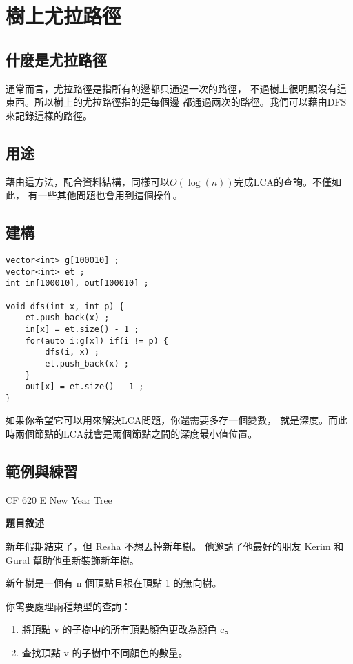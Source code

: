 \section{樹上尤拉路徑}
    \subsection{什麼是尤拉路徑}
    通常而言，尤拉路徑是指所有的邊都只通過一次的路徑，
    不過樹上很明顯沒有這東西。所以樹上的尤拉路徑指的是每個邊
    都通過兩次的路徑。我們可以藉由DFS來記錄這樣的路徑。

    \subsection{用途}
    藉由這方法，配合資料結構，同樣可以$O(\log(n))$完成LCA的查詢。不僅如此，
    有一些其他問題也會用到這個操作。

    \subsection{建構}
\begin{lstlisting}[caption=樹上尤拉路徑]
vector<int> g[100010] ;
vector<int> et ;
int in[100010], out[100010] ;
 
void dfs(int x, int p) {
    et.push_back(x) ;
    in[x] = et.size() - 1 ;
    for(auto i:g[x]) if(i != p) {
        dfs(i, x) ;
        et.push_back(x) ;
    }
    out[x] = et.size() - 1 ;
}
\end{lstlisting}

    如果你希望它可以用來解決LCA問題，你還需要多存一個變數，
    就是深度。而此時兩個節點的LCA就會是兩個節點之間的深度最小值位置。

    \subsection{範例與練習}
    \problem CF 620 E New Year Tree

    \textbf{題目敘述}

    新年假期結束了，但 Resha 不想丟掉新年樹。
    他邀請了他最好的朋友 Kerim 和 Gural 幫助他重新裝飾新年樹。

    新年樹是一個有 n 個頂點且根在頂點 1 的無向樹。

    你需要處理兩種類型的查詢：

    \begin{enumerate}
        \item 將頂點 v 的子樹中的所有頂點顏色更改為顏色 c。
        \item 查找頂點 v 的子樹中不同顏色的數量。
    \end{enumerate}

